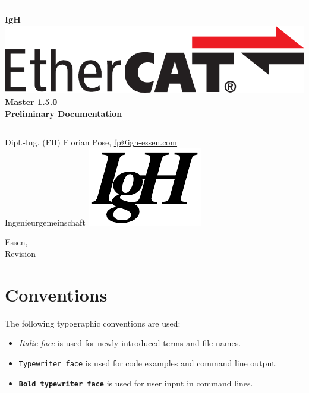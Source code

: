 \documentclass[a4paper,12pt,BCOR6mm,bibtotoc,idxtotoc]{scrbook}
\makeatletter
\renewcommand*{\lstlistoflistings}{%
  \begingroup
    \if@twocolumn
      \@restonecoltrue\onecolumn
    \else
      \@restonecolfalse
    \fi
    \lol@heading
    \setlength{\parskip}{\z@}%
    \setlength{\parindent}{\z@}%
    \setlength{\parfillskip}{\z@ \@plus 1fil}%
    \@starttoc{lol}%
    \if@restonecol\twocolumn\fi
  \endgroup
}
\newcommand{\IgH}{\raisebox{-0.7667ex}
  {\includegraphics[height=2.2ex]{images/ighsign}}}
\newcommand{\masterversion}{1.5.0}
\makeatother
\begin{document}
\pagestyle{empty}

\begin{titlepage}
  \begin{center}
    \rule{\textwidth}{1.5mm}

    {\Huge\bf IgH \includegraphics[height=2.4ex]{images/ethercat}
      Master \masterversion\\[1ex]
      Preliminary Documentation}

    \vspace{1ex}
    \rule{\textwidth}{1.5mm}

    \vspace{\fill} {\Large Dipl.-Ing. (FH) Florian Pose,
    \url{fp@igh-essen.com}\\[1ex] Ingenieurgemeinschaft \IgH}

    \vspace{\fill}
    {\Large Essen, \SVNDate\\[1ex]
      Revision \SVNRevision}
  \end{center}
\end{titlepage}


\tableofcontents
\listoftables
\listoffigures


\newpage
\pagestyle{scrheadings}

\section*{Conventions}

The following typographic conventions are used:

\begin{itemize}

\item \textit{Italic face} is used for newly introduced terms and file names.

\item \texttt{Typewriter face} is used for code examples and command line
output.

\item \texttt{\textbf{Bold typewriter face}} is used for user input in command
lines.

\end{itemize}
\end{document}
